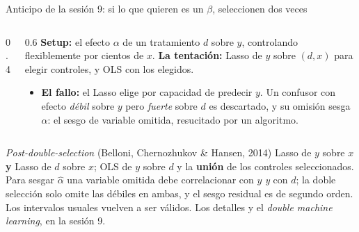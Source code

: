 \documentclass{beamer}
\newcommand{\1}{\mathbb{I}}
\begin{document}
\begin{frame}{Anticipo de la sesión 9: si lo que quieren es un $\beta$, seleccionen dos veces}
\small
\begin{columns}[T]
\begin{column}{0.4\textwidth}
\begin{center}
\end{center}
\end{column}
\begin{column}{0.6\textwidth}
\vspace{0.05cm}
\textbf{Setup:} el efecto $\alpha$ de un tratamiento $d$ sobre $y$, controlando flexiblemente por cientos de $x$. \textbf{La tentación:} Lasso de $y$ sobre $(d, x)$ para elegir controles, y OLS con los elegidos.
\pause
\begin{itemize}\itemsep3pt
  \item \textbf{El fallo:} el Lasso elige por capacidad de predecir $y$. Un confusor con efecto \emph{débil} sobre $y$ pero \emph{fuerte} sobre $d$ es descartado, y su omisión sesga $\hat{\alpha}$: el sesgo de variable omitida, resucitado por un algoritmo.
\end{itemize}
\end{column}
\end{columns}
\pause
\vspace{0.05cm}
\begin{block}{\emph{Post-double-selection} (Belloni, Chernozhukov \& Hansen, 2014)}
Lasso de $y$ sobre $x$ \textbf{y} Lasso de $d$ sobre $x$; OLS de $y$ sobre $d$ y la \textbf{unión} de los controles seleccionados. Para sesgar $\hat{\alpha}$ una variable omitida debe correlacionar con $y$ \emph{y} con $d$; la doble selección solo omite las débiles en ambas, y el sesgo residual es de segundo orden. Los intervalos usuales vuelven a ser válidos. Los detalles y el \emph{double machine learning}, en la sesión 9.
\end{block}
\end{frame}
\end{document}
